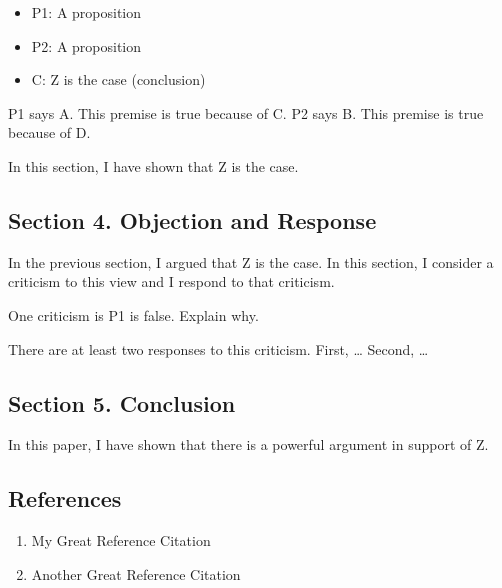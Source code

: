 \begin{itemize}
\tightlist
\item
  P1: A proposition
\item
  P2: A proposition
\item
  C: Z is the case (conclusion)
\end{itemize}

P1 says A. This premise is true because of C. P2 says B. This premise is
true because of D.

In this section, I have shown that Z is the case.

\subsection{Section 4. Objection and
Response}\label{section-4.-objection-and-response}

In the previous section, I argued that Z is the case. In this section, I
consider a criticism to this view and I respond to that criticism.

One criticism is P1 is false. Explain why.

There are at least two responses to this criticism. First, \ldots{}
Second, \ldots{}

\subsection{Section 5. Conclusion}\label{section-5.-conclusion}

In this paper, I have shown that there is a powerful argument in support
of Z.

\subsection{References}\label{references}

\begin{enumerate}
\def\labelenumi{\arabic{enumi}.}
\tightlist
\item
  My Great Reference Citation
\item
  Another Great Reference Citation
\end{enumerate}
